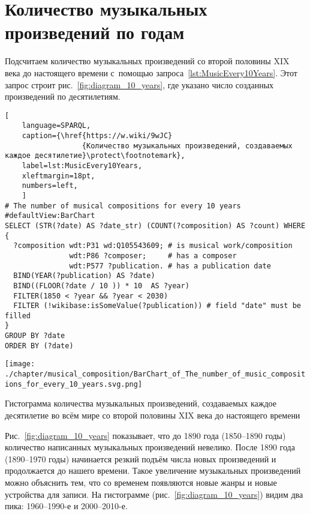\section{Количество музыкальных произведений по годам}

Подсчитаем количество музыкальных произведений 
со второй половины XIX века до настоящего времени 
с~помощью запроса~\ref{lst:MusicEvery10Years}. 
Этот запрос строит рис.~\ref{fig:diagram_10_years}, где 
указано число созданных произведений по десятилетиям. 


\begin{lstlisting}[ 
    language=SPARQL,
    caption={\href{https://w.wiki/9wJC}
                  {Количество музыкальных произведений, создаваемых каждое десятилетие}\protect\footnotemark},
    label=lst:MusicEvery10Years,
    xleftmargin=18pt,
    numbers=left,
    ]
# The number of musical compositions for every 10 years
#defaultView:BarChart
SELECT (STR(?date) AS ?date_str) (COUNT(?composition) AS ?count) WHERE {
  ?composition wdt:P31 wd:Q105543609; # is musical work/composition
               wdt:P86 ?composer;     # has a composer
               wdt:P577 ?publication. # has a publication date
  BIND(YEAR(?publication) AS ?date)
  BIND((FLOOR(?date / 10 )) * 10  AS ?year)
  FILTER(1850 < ?year && ?year < 2030)
  FILTER (!wikibase:isSomeValue(?publication)) # field "date" must be filled
}
GROUP BY ?date
ORDER BY (?date)
\end{lstlisting}%


\begin{marginfigure}[-5\baselineskip]
    \texttt{[image: ./chapter/musical\_composition/BarChart\_of\_The\_number\_of\_music\_compositions\_for\_every\_10\_years.svg.png]}
    \vspace{-7pt}
	\caption{Гистограмма количества музыкальных произведений, 
             создаваемых каждое десятилетие во всём мире со второй половины XIX века до настоящего времени}%
	\label{fig:diagram_10_years}%
\end{marginfigure}
%
Рис.~\ref{fig:diagram_10_years} показывает, что до 1890 года (1850--1890 годы) 
количество написанных музыкальных произведений невелико. 
После 1890 года (1890--1970 годы) начинается резкий подъём числа новых произведений 
и продолжается до нашего времени. 
Такое увеличение музыкальных произведений можно объяснить тем, 
что со временем появляются новые жанры и новые устройства для записи. 
На гистограмме (рис.~\ref{fig:diagram_10_years}) видим два пика: 1960--1990-е и 2000--2010-е.


